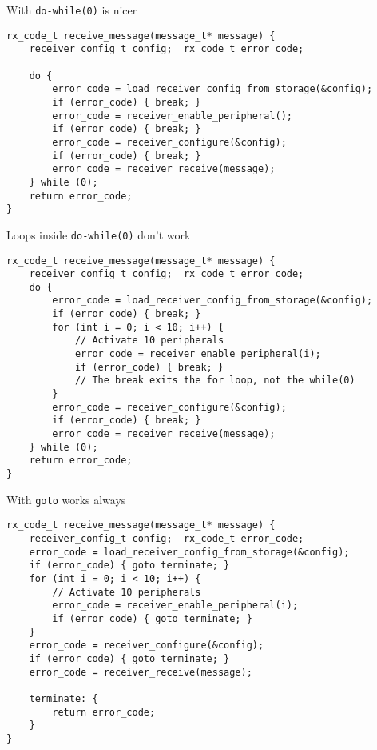 \documentclass[aspectratio=169,14pt]{beamer}
\begin{document}
\begin{frame}[fragile]{With \texttt{do-while(0)} is nicer}
\begin{lstlisting}[style=cstyle]
rx_code_t receive_message(message_t* message) {
    receiver_config_t config;  rx_code_t error_code;
    
    do {
        error_code = load_receiver_config_from_storage(&config);
        if (error_code) { break; }
        error_code = receiver_enable_peripheral();
        if (error_code) { break; }
        error_code = receiver_configure(&config);
        if (error_code) { break; }
        error_code = receiver_receive(message);
    } while (0);
    return error_code;
}
\end{lstlisting}
\end{frame}



\begin{frame}[fragile]{Loops inside \texttt{do-while(0)} don't work}
\begin{lstlisting}[style=cstyle]
rx_code_t receive_message(message_t* message) {
    receiver_config_t config;  rx_code_t error_code;
    do {
        error_code = load_receiver_config_from_storage(&config);
        if (error_code) { break; }
        for (int i = 0; i < 10; i++) {
            // Activate 10 peripherals
            error_code = receiver_enable_peripheral(i);
            if (error_code) { break; }
            // The break exits the for loop, not the while(0)
        }
        error_code = receiver_configure(&config);
        if (error_code) { break; }
        error_code = receiver_receive(message);
    } while (0);
    return error_code;
}
\end{lstlisting}
\end{frame}



\begin{frame}[fragile]{With \texttt{goto} works always}
\begin{lstlisting}[style=cstyle]
rx_code_t receive_message(message_t* message) {
    receiver_config_t config;  rx_code_t error_code;
    error_code = load_receiver_config_from_storage(&config);
    if (error_code) { goto terminate; }
    for (int i = 0; i < 10; i++) {
        // Activate 10 peripherals
        error_code = receiver_enable_peripheral(i);
        if (error_code) { goto terminate; }
    }
    error_code = receiver_configure(&config);
    if (error_code) { goto terminate; }
    error_code = receiver_receive(message);
    
    terminate: {
        return error_code;
    }
}
\end{lstlisting}
\end{frame}
\end{document}
